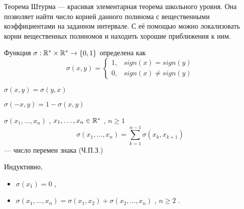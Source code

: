



    
\SScover
    

Теорема Штурма --- красивая элементарная теорема школьного уровня. Она позволяет найти число корней данного полинома с вещественными коэффициентами на заданном интервале.
С её помощью можно локализовать корни вещественных полиномов и находить хорошие приближения к ним.

\vspace

\SSbullet 


\SSsect[def] Функция \( \sigma: \mathbb{R}^* \times \mathbb{R}^* \rightarrow \{0,1\} \) определена как
\[ \sigma(x,y) = 
   \begin{cases} 
       1, & sign(x) = sign(y) \\ 
       0, & sign(x) \neq sign(y)
   \end{cases} 
\]

\SSsect \( \sigma(x,y) = \sigma(y,x) \)

\SSsect \( \sigma(-x,y) = 1 - \sigma(x,y) \)

\SSsect[def] \( \sigma(x_1,\dots,x_n) \) , \( x_1,\dots,x_n \in \mathbb{R}^* \) , \( n \geqslant 1 \)
\[ \sigma(x_1,\dots,x_n) = \sum_{k=1}^{n-1} \sigma(x_k,x_{k+1})
\]
--- число перемен знака (Ч.П.З.)

\SSsect Индуктивно,
\begin{itemize}[label=]
\item \( \sigma(x_1) = 0 \) ,
\item \( \sigma(x_1,\dots,x_n) = \sigma(x_1,x_2) + \sigma(x_2,\dots,x_n) \) , \( n \geqslant 2 \) .
\end{itemize}
        



